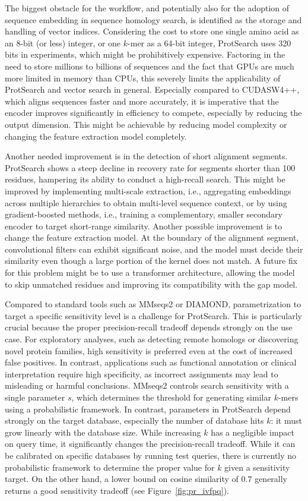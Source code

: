 \documentclass[twoside,a4paper]{master}
\begin{document}
The biggest obstacle for the workflow, and potentially also for the adoption of sequence embedding in sequence homology search, is identified as the storage and handling of vector indices. Considering the cost to store one single amino acid as an 8-bit (or less) integer, or one \(k\)-mer as a 64-bit integer, ProtSearch uses 320 bits in experiments, which might be prohibitively expensive. Factoring in the need to store millions to billions of sequences and the fact that GPUs are much more limited in memory than CPUs, this severely limits the applicability of ProtSearch and vector search in general. Especially compared to CUDASW4++, which aligns sequences faster and more accurately, it is imperative that the encoder improves significantly in efficiency to compete, especially by reducing the output dimension. This might be achievable by reducing model complexity or changing the feature extraction model completely.

Another needed improvement is in the detection of short alignment segments. ProtSearch shows a steep decline in recovery rate for segments shorter than 100 residues, hampering its ability to conduct a high-recall search. This might be improved by implementing multi-scale extraction, i.e., aggregating embeddings across multiple hierarchies to obtain multi-level sequence context, or by using gradient-boosted methods, i.e., training a complementary, smaller secondary encoder to target short-range similarity. Another possible improvement is to change the feature extraction model. At the boundary of the alignment segment, convolutional filters can exhibit significant noise, and the model must decide their similarity even though a large portion of the kernel does not match. A future fix for this problem might be to use a transformer architecture, allowing the model to skip unmatched residues and improving its compatibility with the gap model.

Compared to standard tools such as MMseqs2 or DIAMOND, parametrization to target a specific sensitivity level is a challenge for ProtSearch. This is particularly crucial because the proper precision-recall tradeoff depends strongly on the use case. For exploratory analyses, such as detecting remote homologs or discovering novel protein families, high sensitivity is preferred even at the cost of increased false positives. In contrast, applications such as functional annotation or clinical interpretation require high specificity, as incorrect assignments may lead to misleading or harmful conclusions. MMseqs2 controls search sensitivity with a single parameter \(s\), which determines the threshold for generating similar \(k\)-mers using a probabilistic framework. In contrast, parameters in ProtSearch depend strongly on the target database, especially the number of database hits \(k\): it must grow linearly with the database size. While increasing \(k\) has a negligible impact on query time, it significantly changes the precision-recall tradeoff. While it can be calibrated on specific databases by running test queries, there is currently no probabilistic framework to determine the proper value for \(k\) given a sensitivity target. On the other hand, a lower bound on cosine similarity of \(0.7\) generally returns a good sensitivity tradeoff (see Figure~\ref{fig:pr_ivfpq}).
\end{document}
